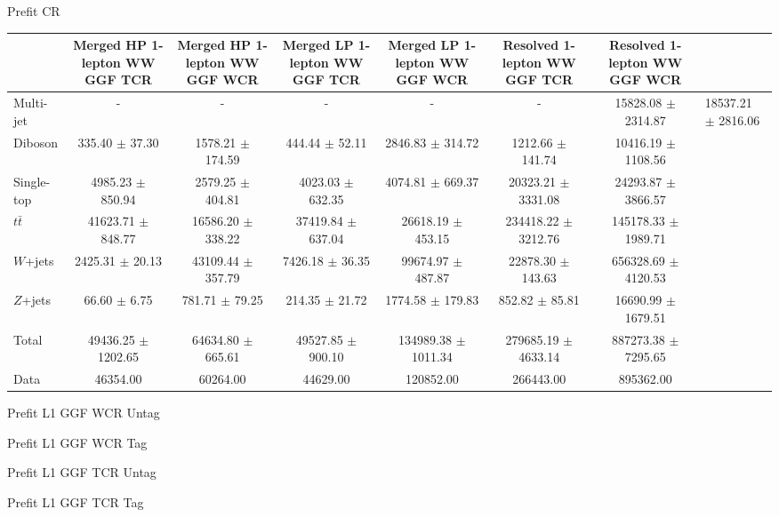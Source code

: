 
 Prefit CR 
\begin{tabular}{|l|c|c|c|c|c|c|}
\hline
	  &	Merged HP 1-lepton WW GGF TCR &	Merged HP 1-lepton WW GGF WCR &	Merged LP 1-lepton WW GGF TCR &	Merged LP 1-lepton WW GGF WCR &	Resolved 1-lepton WW GGF TCR &	Resolved 1-lepton WW GGF WCR \\\hline 
	Multi-jet &	- &	- &	- &	- &	- &	15828.08 $\pm$ 2314.87 &	18537.21 $\pm$ 2816.06 \\\hline 
	Diboson &	335.40 $\pm$ 37.30 &	1578.21 $\pm$ 174.59 &	444.44 $\pm$ 52.11 &	2846.83 $\pm$ 314.72 &	1212.66 $\pm$ 141.74 &	10416.19 $\pm$ 1108.56 \\\hline 
	Single-top &	4985.23 $\pm$ 850.94 &	2579.25 $\pm$ 404.81 &	4023.03 $\pm$ 632.35 &	4074.81 $\pm$ 669.37 &	20323.21 $\pm$ 3331.08 &	24293.87 $\pm$ 3866.57 \\\hline 
	$t\bar{t}$ &	41623.71 $\pm$ 848.77 &	16586.20 $\pm$ 338.22 &	37419.84 $\pm$ 637.04 &	26618.19 $\pm$ 453.15 &	234418.22 $\pm$ 3212.76 &	145178.33 $\pm$ 1989.71 \\\hline 
	$W$+jets &	2425.31 $\pm$ 20.13 &	43109.44 $\pm$ 357.79 &	7426.18 $\pm$ 36.35 &	99674.97 $\pm$ 487.87 &	22878.30 $\pm$ 143.63 &	656328.69 $\pm$ 4120.53 \\\hline 
	$Z$+jets &	66.60 $\pm$ 6.75 &	781.71 $\pm$ 79.25 &	214.35 $\pm$ 21.72 &	1774.58 $\pm$ 179.83 &	852.82 $\pm$ 85.81 &	16690.99 $\pm$ 1679.51 \\\hline 
	Total &	49436.25 $\pm$ 1202.65 &	64634.80 $\pm$ 665.61 &	49527.85 $\pm$ 900.10 &	134989.38 $\pm$ 1011.34 &	279685.19 $\pm$ 4633.14 &	887273.38 $\pm$ 7295.65 \\\hline 
	Data &	46354.00 &	60264.00 &	44629.00 &	120852.00 &	266443.00 &	895362.00 \\\hline 
\end{tabular}

 Prefit L1 GGF WCR Untag 

 Prefit L1 GGF WCR Tag 

 Prefit L1 GGF TCR Untag 

 Prefit L1 GGF TCR Tag 








